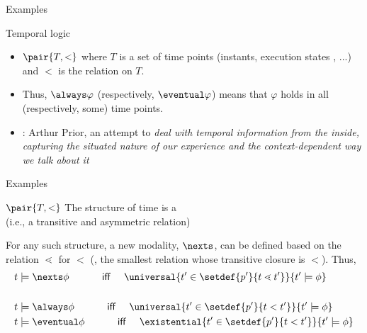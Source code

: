 \documentclass{beamer}
\begin{document}
\begin{slide}{Examples}\label{s:18}
\small
\begin{block}{Temporal logic}
\begin{itemize}
\item $\pair{T, <}$ where $T$ is a set of time points (instants, execution states , ...) and $<$ is the  relation on $T$.
\item Thus, $\always \varphi$ (respectively, $\eventual \varphi$) means that $\varphi$ holds in all (respectively, some)  time points.
\item {}: Arthur Prior, an attempt to \emph{deal with temporal information from the inside, capturing the situated nature of our experience and the context-dependent way we talk about it} 
\end{itemize}
\end{block}
\end{slide}

\begin{slide}{Examples}\label{s:18a}
\small

\begin{block}{$\pair{T,<}$}
The structure of time is a  \\ (i.e., a transitive and asymmetric relation)
\vspace{0.3cm}

\noindent
For any such structure, a new modality, $\nexts$, can be defined based on the  relation $\lessdot$ for $<$ (\ie, the smallest relation whose transitive closure is $<$). Thus,
\begin{align*}
t & \models \nexts \phi \text{ ~~~~~~~~ \textsf{iff} ~~~} 
\universal{t' \in \setdef{p'}{t \lessdot t' }}{t' \models \phi} \\ &\\
t & \models \always \phi \text{ ~~~~~~~~ \textsf{iff} ~~~} 
\universal{t' \in \setdef{p'}{t < t' }}{t' \models \phi} \\
t & \models \eventual \phi \text{ ~~~~~~~~ \textsf{iff} ~~~} 
\existential{t' \in \setdef{p'}{t < t' }}{t' \models \phi} \\
\end{align*}
\end{block}

\end{slide}
\end{document}
